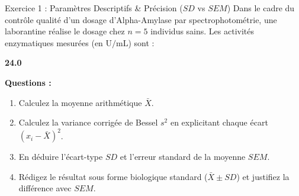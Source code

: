 \documentclass[11pt,a4paper]{article}
\begin{document}
\begin{exercicebox}{Exercice 1 : Paramètres Descriptifs \& Précision ($SD$ vs $SEM$)}
Dans le cadre du contrôle qualité d'un dosage d'Alpha-Amylase par spectrophotométrie, une laborantine réalise le dosage chez $n = 5$ individus sains. Les activités enzymatiques mesurées (en $\text{U/mL}$) sont :
\begin{center}
\textbf{24.0    }
\end{center}
\textbf{Questions :}
\begin{enumerate}[label=\textbf{\alph*.}]
  \item Calculez la moyenne arithmétique $\bar{X}$.
  \item Calculez la variance corrigée de Bessel $s^2$ en explicitant chaque écart $(x_i - \bar{X})^2$.
  \item En déduire l'écart-type $SD$ et l'erreur standard de la moyenne $SEM$.
  \item Rédigez le résultat sous forme biologique standard ($\bar{X} \pm SD$) et justifiez la différence avec $SEM$.
\end{enumerate}
\end{exercicebox}
\end{document}
